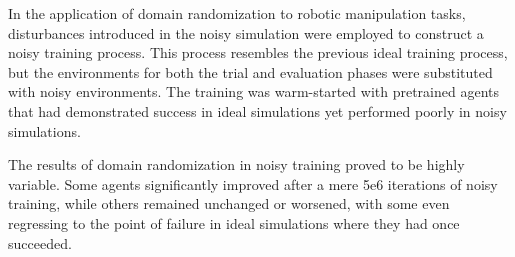 In the application of domain randomization to robotic manipulation tasks, disturbances introduced in the noisy simulation were employed to construct a noisy training process. This process resembles the previous ideal training process, but the environments for both the trial and evaluation phases were substituted with noisy environments. The training was warm-started with pretrained agents that had demonstrated success in ideal simulations yet performed poorly in noisy simulations.

The results of domain randomization in noisy training proved to be highly variable. Some agents significantly improved after a mere 5e6 iterations of noisy training, while others remained unchanged or worsened, with some even regressing to the point of failure in ideal simulations where they had once succeeded.

% 
% 
% 
% 


